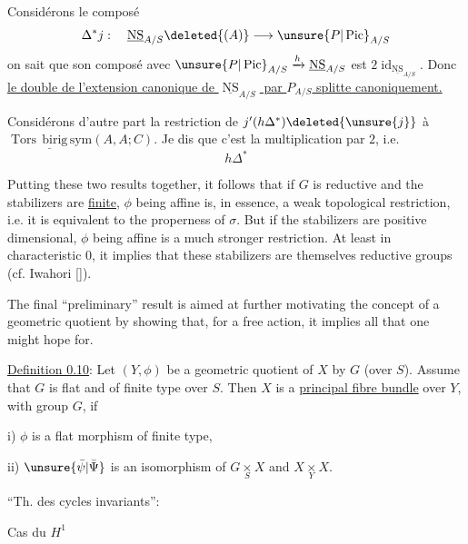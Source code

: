 Considérons le composé
\[
\Delta^*j:\quad\underline{\operatorname{NS}}_{A/S}\deleted{(A)}\longrightarrow\unsure{P|\operatorname{Pic}}_{A/S}
\]
on sait que son composé avec $\unsure{P|\operatorname{Pic}}_{A/S}\xrightarrow{h}\underline{\operatorname{NS}}_{A/S}$ est $2\operatorname{id}_{\underline{\operatorname{NS}}_{A/S}}$. Donc \uline{le double de l'extension canonique de $\underline{\operatorname{NS}}_{A/S}$ par $P_{A/S}$ splitte canoniquement.}


Considérons d'autre part la restriction de $j'(h\Delta^*)\deleted{\unsure{j}}$ à $\underline{\operatorname{Tors}\,\mathrm{birig}\,\mathrm{sym}}(A,A;C)$.
Je dis que c'est la multiplication par $2$, i.e.
\[
h\Delta^*
\]



Putting these two results together, it follows that if $G$ is reductive and the stabilizers are \uline{finite}, $\phi$ being affine is, in essence, a weak topological restriction, i.e. it is equivalent to the properness of $\sigma$. But if the stabilizers are positive dimensional, $\phi$ being affine is a much stronger restriction. At least in characteristic 0, it implies that these stabilizers are themselves reductive groups (cf. Iwahori [\quad]).

The final ``preliminary'' result is aimed at further motivating the concept of a geometric quotient by showing that, for a free action, it implies all that one might hope for.

\uline{Definition 0.10}: Let $(Y,\phi)$ be a geometric quotient of $X$ by $G$ (over $S$). Assume that $G$ is flat and of finite type over $S$. Then $X$ is a \uline{principal fibre bundle} over $Y$, with group $G$, if

\qquad i) $\phi$ is a flat morphism of finite type,

\qquad ii) $\unsure{\bar\psi|\bar\Psi}$ is an isomorphism of $G\mathbin{\underset{S}{\times}}X$ and $X\mathbin{\underset{Y}{\times}}X$.



``Th. des cycles invariants'':

Cas du $H^1$

